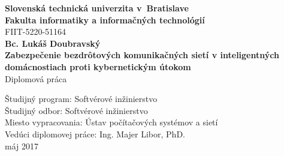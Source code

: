 \documentclass[12pt,a4wide,oneside,openright]{report}
\begin{document}
\titleformat{\chapter}[hang]{\bf\huge}{\thechapter}{2pc}{}
\setcounter{tocdepth}{3}
\begin{titlepage}
	\begin{center}
	\large \textbf{Slovenská technická univerzita v~Bratislave \\
	Fakulta informatiky a informačných technológií} \\
	\vspace{0.8cm}	
	\normalsize FIIT-5220-51164 \\
	\vspace{7cm}
	\Large \textbf{Bc. Lukáš Doubravský} \\
	\vspace{0.5cm}
	\textbf{Zabezpečenie bezdrôtových komunikačných sietí v inteligentných domácnostiach proti kybernetickým útokom} \\
	\vspace{0.5cm}
    Diplomová práca
	\end{center}
	\vspace{4.5cm}	
	\begin{flushleft}
	\begin{onehalfspacing}
		Študijný program: Softvérové inžinierstvo \\
		Študijný odbor: Softvérové inžinierstvo \\
		Miesto vypracovania: 
		Ústav počítačových systémov a sietí  \\
		Vedúci diplomovej práce: Ing. Majer Libor, PhD. \\
		\vspace{0.5cm}
		máj 2017  
	\end{onehalfspacing}	
	\end{flushleft}
\end{titlepage}

\newpage
\thispagestyle{empty}
\mbox{}

\end{document}
